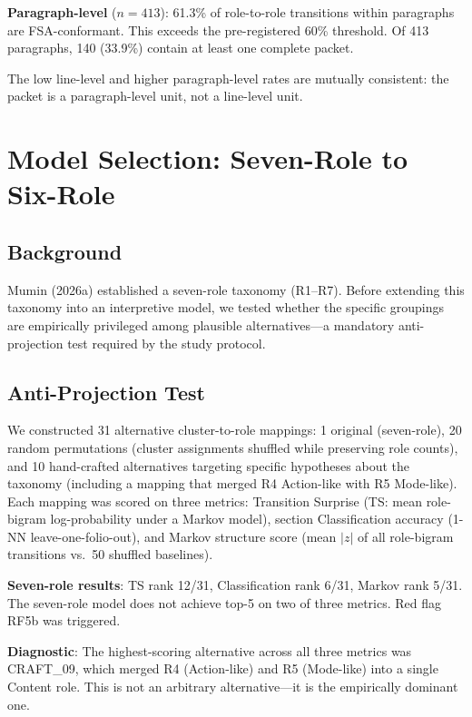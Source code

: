 \documentclass[11pt,a4paper,twocolumn]{article}
\begin{document}
\textbf{Paragraph-level} ($n = 413$): 61.3\% of role-to-role transitions within paragraphs are FSA-conformant. This exceeds the pre-registered 60\% threshold. Of 413 paragraphs, 140 (33.9\%) contain at least one complete packet.

The low line-level and higher paragraph-level rates are mutually consistent: the packet is a paragraph-level unit, not a line-level unit.

\section{Model Selection: Seven-Role to Six-Role}
\label{sec:modelsel}

\subsection{Background}

Mumin (2026a) established a seven-role taxonomy (R1--R7). Before extending this taxonomy into an interpretive model, we tested whether the specific groupings are empirically privileged among plausible alternatives---a mandatory anti-projection test required by the study protocol.

\subsection{Anti-Projection Test}

We constructed 31 alternative cluster-to-role mappings: 1 original (seven-role), 20 random permutations (cluster assignments shuffled while preserving role counts), and 10 hand-crafted alternatives targeting specific hypotheses about the taxonomy (including a mapping that merged R4 Action-like with R5 Mode-like). Each mapping was scored on three metrics: Transition Surprise (TS: mean role-bigram log-probability under a Markov model), section Classification accuracy (1-NN leave-one-folio-out), and Markov structure score (mean $|z|$ of all role-bigram transitions vs.\ 50 shuffled baselines).

\textbf{Seven-role results}: TS rank 12/31, Classification rank 6/31, Markov rank 5/31. The seven-role model does not achieve top-5 on two of three metrics. Red flag RF5b was triggered.

\textbf{Diagnostic}: The highest-scoring alternative across all three metrics was CRAFT\_09, which merged R4 (Action-like) and R5 (Mode-like) into a single Content role. This is not an arbitrary alternative---it is the empirically dominant one.
\end{document}
